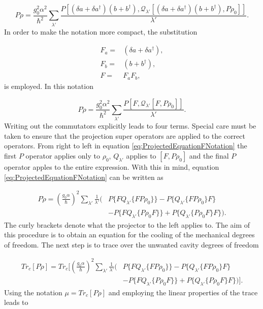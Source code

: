 \documentclass[12pt]{article}
\begin{document}
\begin{equation}
    P\dot{\rho}=\frac{g_0^2\alpha^2}{\hbar^2}\sum_{\lambda'} \frac{ P[ (\delta a +  \delta a^\dagger)  (b+b^\dagger),\mathcal{Q}_{\lambda'}[(\delta a +  \delta a^\dagger) (b+b^\dagger),P \rho_0]]}{\lambda'}.
\end{equation} In order to make the notation more compact, the substitution

\begin{align}
    F_a =& (\delta a + \delta a^\dagger),\\
    F_b =& (b + b^\dagger),\\
    F =& F_a F_b,
\end{align} is employed. In this notation

\begin{equation}\label{eq:ProjectedEquationFNotation}
    P\dot{\rho}=\frac{g_0^2\alpha^2}{\hbar^2}\sum_{\lambda'} \frac{ P[ F,\mathcal{Q}_{\lambda'}[F,P \rho_0]]}{\lambda'}.
\end{equation}  Writing out the commutators explicitly leads to four terms. Special care must be taken to ensure that the projection super operators are applied to the correct operators. From right to left in equation \eqref{eq:ProjectedEquationFNotation} the first $P$ operator applies only to $\rho_0$,  $Q_{\lambda'}$ applies to $[F,P \rho_0]$ and the final $P$ operator apples to the entire expression. With this in mind, equation \eqref{eq:ProjectedEquationFNotation} can be written as

\begin{align}
    P\dot{\rho} = (\frac{g_0 \alpha}{\hbar})^2 \sum_{\lambda'}\frac{1}{\lambda'}\Bigg(& P\{FQ_{\lambda'}\{FP\rho_0\}\}-P\{Q_{\lambda'}\{FP\rho_0\}F\}\\
    &-P\{FQ_{\lambda'}\{P\rho_0F \} \} +P\{Q_{\lambda'}\{P\rho_0 F\}F\} \Bigg). \nonumber
\end{align} The curly brackets denote what the projector to the left applies to. The aim of this procedure is to obtain an equation for the cooling of the mechanical degrees of freedom. The next step is to trace over the unwanted cavity degrees of freedom

\begin{align}
   Tr_c[P\dot{\rho}] = Tr_c[(\frac{g_0 \alpha}{\hbar})^2 \sum_{\lambda'}\frac{1}{\lambda'}\Bigg(& P\{FQ_{\lambda'}\{FP\rho_0\}\}-P\{Q_{\lambda'}\{FP\rho_0\}F\}\\
    &-P\{FQ_{\lambda'}\{P\rho_0F \} \} +P\{Q_{\lambda'}\{P\rho_0 F\}F\} \Bigg)].\nonumber
\end{align}  Using the notation $\mu = Tr_c[P\rho]$ and employing the linear properties of the trace leads to
\end{document}
